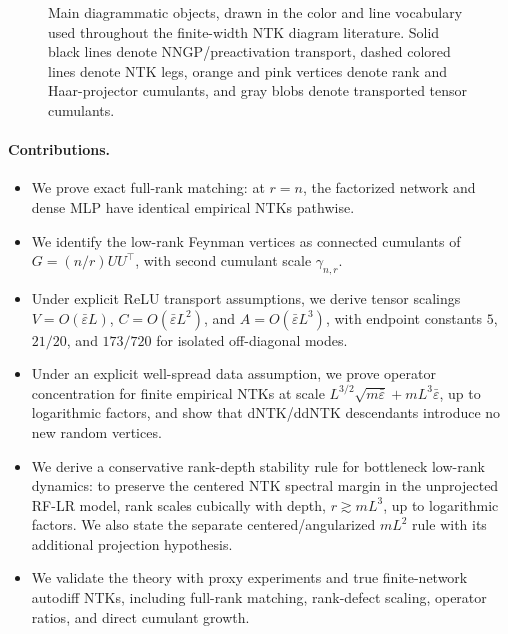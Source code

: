 \documentclass{article}
\newcommand{\barE}{\bar\varepsilon}
\begin{document}
\begin{figure}[t]
{
}
\caption{Main diagrammatic objects, drawn in the color and line vocabulary used throughout the finite-width NTK diagram literature. Solid black lines denote NNGP/preactivation transport, dashed colored lines denote NTK legs, orange and pink vertices denote rank and Haar-projector cumulants, and gray blobs denote transported tensor cumulants.}
\label{fig:main-diagrammatic-overview}
\end{figure}

\paragraph{Contributions.}
\begin{itemize}[leftmargin=1.4em]
\item We prove exact full-rank matching: at \(r=n\), the factorized network and dense MLP have identical empirical NTKs pathwise.
\item We identify the low-rank Feynman vertices as connected cumulants of \(G=(n/r)UU^\top\), with second cumulant scale \(\gamma_{n,r}\).
\item Under explicit ReLU transport assumptions, we derive tensor scalings \(V=O(\barE L)\), \(C=O(\barE L^2)\), and \(A=O(\barE L^3)\), with endpoint constants \(5\), \(21/20\), and \(173/720\) for isolated off-diagonal modes.
\item Under an explicit well-spread data assumption, we prove operator concentration for finite empirical NTKs at scale \(L^{3/2}\sqrt{m\barE}+mL^3\barE\), up to logarithmic factors, and show that dNTK/ddNTK descendants introduce no new random vertices.
\item We derive a conservative rank-depth stability rule for bottleneck low-rank dynamics: to preserve the centered NTK spectral margin in the unprojected RF-LR model, rank scales cubically with depth, \(r\gtrsim mL^3\), up to logarithmic factors. We also state the separate centered/angularized \(mL^2\) rule with its additional projection hypothesis.
\item We validate the theory with proxy experiments and true finite-network autodiff NTKs, including full-rank matching, rank-defect scaling, operator ratios, and direct cumulant growth.
\end{itemize}
\end{document}
